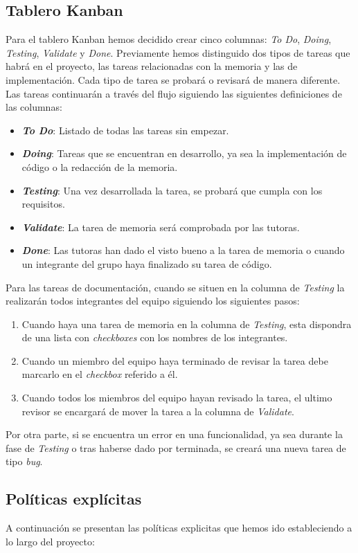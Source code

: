 \subsection{Tablero Kanban}
Para el tablero Kanban hemos decidido crear cinco columnas: \textit{To Do}, \textit{Doing}, \textit{Testing}, \textit{Validate} y \textit{Done}.
Previamente hemos distinguido dos tipos de tareas que habrá en el proyecto, las tareas relacionadas con la memoria y las de implementación. Cada tipo de tarea se probará o revisará de manera diferente.
Las tareas continuarán a través del flujo siguiendo las siguientes definiciones de las columnas:
\begin{itemize}
    \item \textbf{\textit{To Do}}: Listado de todas las tareas sin empezar.
    \item \textbf{\textit{Doing}}: Tareas que se encuentran en desarrollo, ya sea la implementación de código o la redacción de la memoria.
    \item \textbf{\textit{Testing}}: Una vez desarrollada la tarea, se probará que cumpla con los requisitos.
    \item \textbf{\textit{Validate}}: La tarea de memoria será comprobada por las tutoras.
    \item \textbf{\textit{Done}}: Las tutoras han dado el visto bueno a la tarea de memoria o cuando un integrante del grupo haya finalizado su tarea de código.
\end{itemize}
Para las tareas de documentación, cuando se situen en la columna de \textit{Testing} la realizarán todos integrantes del equipo siguiendo los siguientes pasos:
\begin{enumerate}
    \item Cuando haya una tarea de memoria en la columna de \textit{Testing}, esta dispondra de una lista con \textit{checkboxes} con los nombres de los integrantes.
    \item Cuando un miembro del equipo haya terminado de revisar la tarea debe marcarlo en el \textit{checkbox} referido a él.
    \item Cuando todos los miembros del equipo hayan revisado la tarea, el ultimo revisor se encargará de mover la tarea a la columna de \textit{Validate}.
\end{enumerate}
Por otra parte, si se encuentra un error en una funcionalidad, ya sea durante la fase de \textit{Testing} o tras haberse dado por terminada, se creará una nueva tarea de tipo \textit{bug}.

\subsection{Políticas explícitas}
A continuación se presentan las políticas explicitas que hemos ido estableciendo a lo largo del proyecto:

